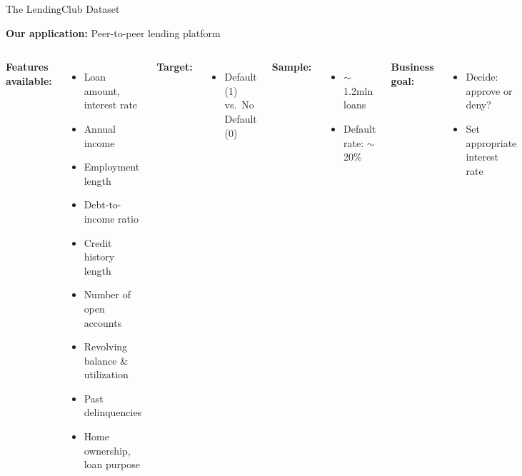 \documentclass[10pt]{beamer}
\begin{document}
\begin{frame}{The LendingClub Dataset}

  \textbf{Our application:} Peer-to-peer lending platform

  \vspace{0.5em}
  \begin{columns}[T]
    \textbf{Features available:}
    \begin{itemize}
      \item Loan amount, interest rate
      \item Annual income
      \item Employment length
      \item Debt-to-income ratio
      \item Credit history length
      \item Number of open accounts
      \item Revolving balance \& utilization
      \item Past delinquencies
      \item Home ownership, loan purpose
    \end{itemize}

    \textbf{Target:}
    \begin{itemize}
      \item Default (1) vs.\ No Default (0)
    \end{itemize}

    \vspace{0.5em}
    \textbf{Sample:}
    \begin{itemize}
      \item $\sim$1.2mln loans
      \item Default rate: $\sim$20\%
    \end{itemize}

    \vspace{0.5em}
    \textbf{Business goal:}
    \begin{itemize}
      \item Decide: approve or deny?
      \item Set appropriate interest rate
    \end{itemize}
  \end{columns}
\end{frame}

\end{document}
